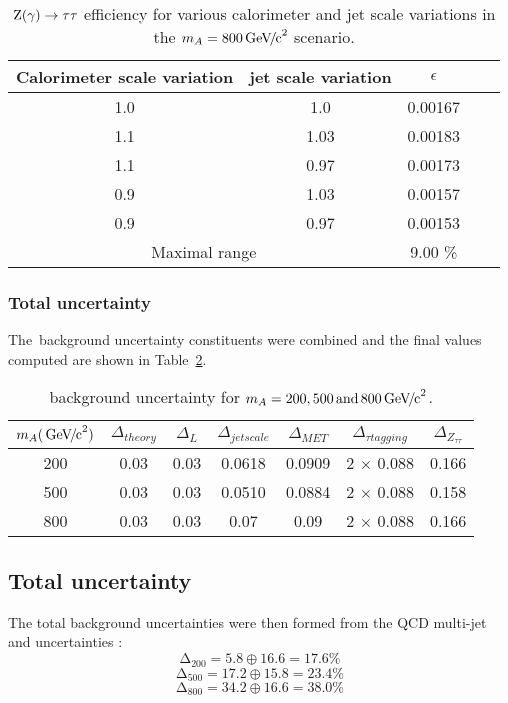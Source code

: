 \begin{table}[!Hh]
	\centering
	\begin{tabular}{|c|c|c|c|c|}
	\hline
	Calorimeter scale variation & jet scale variation & $\epsilon$ \\ \hline
	1.0   &  1.0   &  0.00167 \\ \hline
	1.1   &  1.03  &  0.00183 \\ \hline
	1.1   &  0.97  &  0.00173 \\ \hline
	0.9   &  1.03  &  0.00157 \\ \hline
	0.9   &  0.97  &  0.00153 \\ \hline
	\multicolumn{2}{|c|}{Maximal range} & 9.00 \% \\ \hline          
    \end{tabular}
\caption{$\mathrm{Z(\gamma) \rightarrow \tau\tau}$ \MET efficiency for various calorimeter and jet scale variations in the $m_{A} = 800 {\,\mathrm{Ge\hspace{-.08em}V\hspace{-0.16em}/\hspace{-0.08em}c}^\mathrm{2}}$ scenario.\label{tab:metScale800}}
\end{table}
\newpage
\subsubsection{Total \Ztautau\xspace uncertainty}
The \Ztautau\,background uncertainty constituents were combined and the final values computed are shown in Table~\ref{tab:zUncertain}.

\begin{table}[!Hh]
	\centering
	\begin{tabular}{|c|c|c|c|c|c|c|}
	\hline
	$m_{A} ({\,\mathrm{Ge\hspace{-.08em}V\hspace{-0.16em}/\hspace{-0.08em}c}^\mathrm{2}})$ & $\Delta_{theory}$ & $\Delta_{L}$ & $\Delta_{jet scale}$ & $\Delta_{MET}$ & $\Delta_{\tau tagging}$ & $\Delta_{Z_{\tau \tau}}$ \\ \hline
	200 & 0.03 & 0.03 & 0.0618 & 0.0909 & 2 $\times$ 0.088 & 0.166 \\ \hline
	500 & 0.03 & 0.03 & 0.0510 & 0.0884 & 2 $\times$ 0.088 & 0.158 \\ \hline
	800 & 0.03 & 0.03 & 0.07 & 0.09 & 2 $\times$ 0.088 & 0.166 \\ \hline 
    \end{tabular}
\caption{\Ztautau\xspace background uncertainty for $m_{A} = 200, 500 \mathrm{\,and\,} 800 {\,\mathrm{Ge\hspace{-.08em}V\hspace{-0.16em}/\hspace{-0.08em}c}^\mathrm{2}}$.\label{tab:zUncertain}}
\end{table}

\subsection{Total uncertainty}
The total background uncertainties were then formed from the QCD multi-jet and \ZTauTau uncertainties	:
\begin{equation}
	\mathrm{\Delta_{200} = 5.8 \oplus 16.6 = 17.6\%}
\end{equation}
\begin{equation}
	\mathrm{\Delta_{500} = 17.2 \oplus 15.8 = 23.4\%}
\end{equation}
\begin{equation}
	\mathrm{\Delta_{800} = 34.2 \oplus 16.6 = 38.0\%}
\end{equation}

